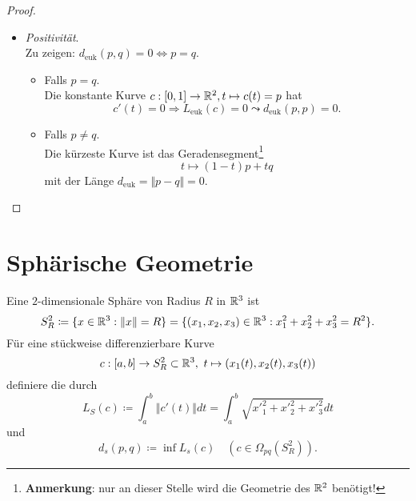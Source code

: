 \begin{theorem}
\begin{proof}
\begin{itemize}
      \item \emph{Positivität}. \\
        Zu zeigen: $ d_\text{euk}(p,q) = 0 \Leftrightarrow p = q $.
        \begin{itemize}
          \item Falls $ p = q $. \\
            Die konstante Kurve $ c: [0,1] \to \mathbb{R}^2, t \mapsto c(t) = p $ hat 
            \begin{equation*}
              c'(t) = 0 \Rightarrow L_\text{euk}(c) = 0 \leadsto d_\text{euk}(p,p) = 0 \text{.}
            \end{equation*}
          \item Falls $ p \neq q $. \\
            Die kürzeste Kurve ist das Geradensegment\footnote{\textbf{Anmerkung}: nur an dieser Stelle wird die Geometrie des $ \mathbb{R}^2 $ benötigt!}
            \begin{equation*}
              t \mapsto (1-t)p + tq
            \end{equation*}
            mit der Länge $ d_\text{euk} = \Vert p - q \Vert = 0 $.
        \end{itemize}
    \end{itemize}
  \end{proof}
\end{theorem}

\section{Sphärische Geometrie}
\begin{example}
  Eine $ 2 $-dimensionale Sphäre von Radius $ R $ in $ \mathbb{R}^3 $ ist
  \begin{equation*}
    S^2_R \coloneqq \{ x \in \mathbb{R}^3 : \Vert x \Vert = R \} = \{ (x_1, x_2, x_3) \in \mathbb{R}^3 : x_1^2+x_2^2+x_3^2 = R^2 \}\text{.}
  \end{equation*}
  Für eine stückweise differenzierbare Kurve
  \begin{equation*}
    c: [a,b] \to S^2_R \subset \mathbb{R}^3, \ t \mapsto (x_1(t), x_2(t), x_3(t))
  \end{equation*}
  definiere die  durch
  \begin{equation*}
    L_S(c) \coloneqq \int_a^b \Vert c'(t) \Vert dt = \int_a^b \sqrt{{x'}_1^2+{x'}_2^2+{x'}_3^2}dt
  \end{equation*}
  und
  \begin{equation*}
    d_s(p,q) \coloneqq \inf L_s(c) \quad (c \in \Omega_{pq}(S^2_R))\text{.}
  \end{equation*}
\end{example}

